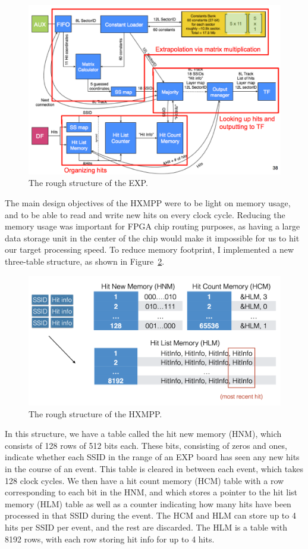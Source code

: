 \begin{figure}[htbp]
    \centering
    \includegraphics[width=\linewidth]{Images/Other/EXTF.png}
    \caption{The rough structure of the EXP.}
    \label{fig:EXTF}
\end{figure}

The main design objectives of the HXMPP were to be light on memory usage, and to be able to read and write new hits on every clock cycle. Reducing the memory usage was important for FPGA chip routing purposes, as having a large data storage unit in the center of the chip would make it impossible for us to hit our target processing speed. To reduce memory footprint, I implemented a new three-table structure, as shown in Figure~\ref{fig:HXMPP}.

\begin{figure}[htbp]
    \centering
    \includegraphics[width=\linewidth]{Images/Other/HXMPP.png}
    \caption{The rough structure of the HXMPP.}
    \label{fig:HXMPP}
\end{figure}

In this structure, we have a table called the hit new memory (HNM), which consists of 128 rows of 512 bits each. These bits, consisting of zeros and ones, indicate whether each SSID in the range of an EXP board has seen any new hits in the course of an event. This table is cleared in between each event, which takes 128 clock cycles. We then have a hit count memory (HCM) table with a row corresponding to each bit in the HNM, and which stores a pointer to the hit list memory (HLM) table as well as a counter indicating how many hits have been processed in that SSID during the event. The HCM and HLM can store up to 4 hits per SSID per event, and the rest are discarded. The HLM is a table with 8192 rows, with each row storing hit info for up to 4 hits.

